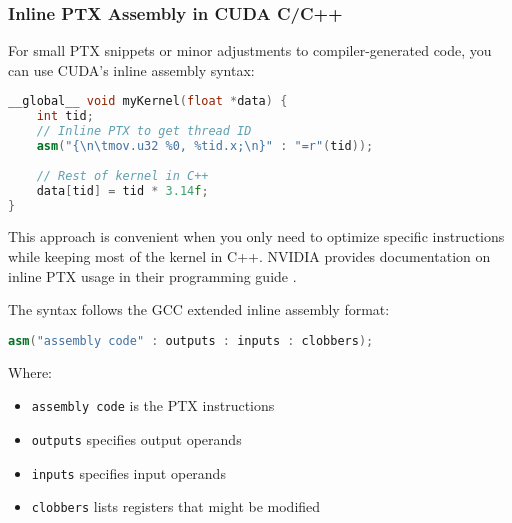 \subsubsection{Inline PTX Assembly in CUDA C/C++}

For small PTX snippets or minor adjustments to compiler-generated code, you can use CUDA's inline assembly syntax:

\begin{lstlisting}[language=C++]
__global__ void myKernel(float *data) {
    int tid;
    // Inline PTX to get thread ID
    asm("{\n\tmov.u32 %0, %tid.x;\n}" : "=r"(tid));
    
    // Rest of kernel in C++
    data[tid] = tid * 3.14f;
}
\end{lstlisting}

This approach is convenient when you only need to optimize specific instructions while keeping most of the kernel in C++. NVIDIA provides documentation on inline PTX usage in their programming guide \citep{stackoverflow_ptx_inline}.

The syntax follows the GCC extended inline assembly format:
\begin{lstlisting}[language=C++]
asm("assembly code" : outputs : inputs : clobbers);
\end{lstlisting}

Where:
\begin{itemize}
    \item \texttt{assembly code} is the PTX instructions
    \item \texttt{outputs} specifies output operands
    \item \texttt{inputs} specifies input operands
    \item \texttt{clobbers} lists registers that might be modified
\end{itemize}

